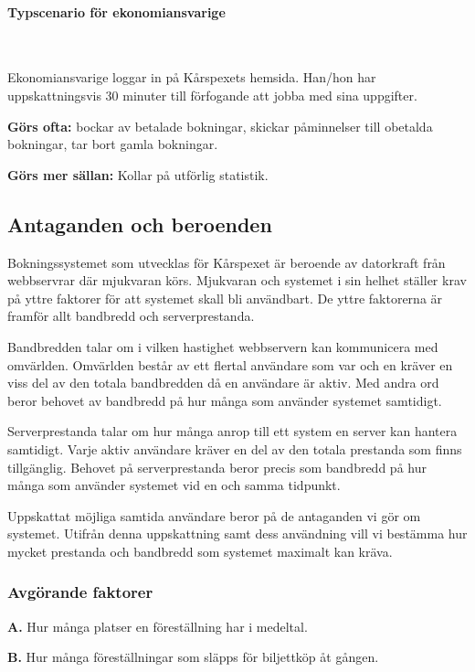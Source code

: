 \documentclass[a4paper, twoside, 11pt, titlepage]{article}
\begin{document}
			\paragraph{Typscenario för ekonomiansvarige}\

			Ekonomiansvarige loggar in på Kårspexets hemsida. Han/hon har uppskattningsvis 30 minuter till förfogande att jobba med sina uppgifter.

			\textbf{Görs ofta:} bockar av betalade bokningar, skickar påminnelser till obetalda bokningar, tar bort gamla bokningar.

			\textbf{Görs mer sällan:} Kollar på utförlig statistik.

	\subsection{Antaganden och beroenden}


	Bokningssystemet som utvecklas för Kårspexet är beroende av datorkraft från webbservrar där mjukvaran körs. Mjukvaran och systemet i sin helhet ställer krav på yttre faktorer för att systemet skall bli användbart. De yttre faktorerna är framför allt bandbredd och serverprestanda.

	Bandbredden talar om i vilken hastighet webbservern kan kommunicera med omvärlden. Omvärlden består av ett flertal användare som var och en kräver en viss del av den totala bandbredden då en användare är aktiv. Med andra ord beror behovet av bandbredd på hur många som använder systemet samtidigt.

	Serverprestanda talar om hur många anrop till ett system en server kan hantera samtidigt. Varje aktiv användare kräver en del av den totala prestanda som finns tillgänglig. Behovet på serverprestanda beror precis som bandbredd på hur många som använder systemet vid en och samma tidpunkt.

	Uppskattat möjliga samtida användare beror på de antaganden vi gör om systemet. Utifrån denna uppskattning samt dess användning vill vi bestämma hur mycket prestanda och bandbredd som systemet maximalt kan kräva.

		\subsubsection{Avgörande faktorer}


		\textbf{A.} Hur många platser en föreställning har i medeltal.

		\textbf{B.} Hur många föreställningar som släpps för biljettköp åt gången.
\end{document}

